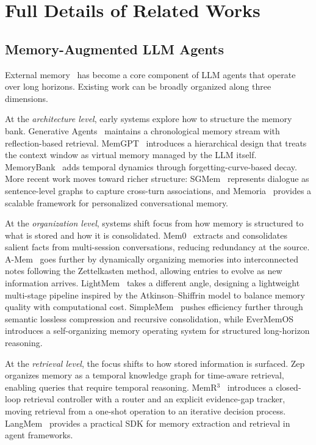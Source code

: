 \section{Full Details of Related Works}
\label{appendix:full_related_works}
\subsection{Memory-Augmented LLM Agents}
\label{appendix:memory_augmented_LLM_related_works}
External memory~\cite{hu2025memory,zhang2025survey} has become a core component of LLM agents that operate over long horizons.
Existing work can be broadly organized along three dimensions.

At the \emph{architecture level}, early systems explore how to 
structure the memory bank.
Generative Agents~\cite{park2023generative} maintains a 
chronological memory stream with reflection-based retrieval.
MemGPT~\cite{packer2023memgpt} introduces a hierarchical design 
that treats the context window as virtual memory managed by the 
LLM itself.
MemoryBank~\cite{zhong2024memorybank} adds temporal dynamics 
through forgetting-curve-based decay.
More recent work moves toward richer structure: 
SGMem~\cite{wu2025sgmem} represents dialogue as sentence-level 
graphs to capture cross-turn associations, and 
Memoria~\cite{sarin2025memoria} provides a scalable framework for 
personalized conversational memory.


At the \emph{organization level}, systems shift focus from how memory is structured to what is stored and how it is consolidated.
Mem0~\cite{chhikara2025mem0} extracts and consolidates salient facts from multi-session conversations, reducing redundancy at the source.
A-Mem~\cite{xu2025mem} goes further by dynamically organizing memories into interconnected notes following the Zettelkasten method, allowing entries to evolve as new information arrives.
LightMem~\cite{fang2025lightmem} takes a different angle, designing a lightweight multi-stage pipeline inspired by the Atkinson--Shiffrin model to balance memory quality with computational cost.
SimpleMem~\cite{liu2026simplemem} pushes efficiency further through semantic lossless compression and recursive consolidation, while EverMemOS~\cite{hu2026evermemos} introduces a self-organizing memory operating system for structured long-horizon reasoning.


At the \emph{retrieval level}, the focus shifts to how stored information is surfaced.
Zep~\cite{rasmussen2025zep} organizes memory as a temporal knowledge graph for time-aware retrieval, enabling queries that require temporal reasoning.
MemR$^3$~\cite{du2025memr} introduces a closed-loop retrieval controller with a router and an explicit evidence-gap tracker, moving retrieval from a one-shot operation to an iterative decision process.
LangMem~\cite{LangMemBlog} provides a practical SDK for memory extraction and retrieval in agent frameworks.


